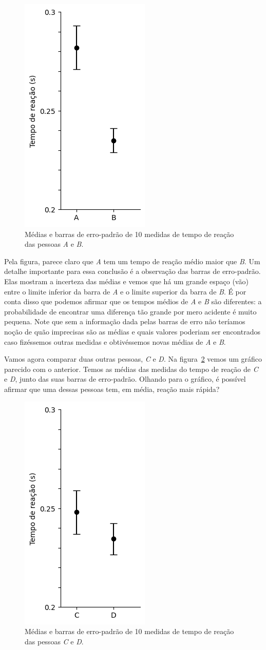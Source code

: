 \documentclass[12pt, a4paper]{article}
\begin{document}
\begin{figure}[H]
    \centering
    \includegraphics[width=0.22\linewidth]{volta de A e B vert.png}
    \caption{Médias e barras de erro-padrão de 10 medidas de tempo de reação das pessoas \textit{A} e \textit{B}.}
    \label{A e B vert}
\end{figure}

Pela figura, parece claro que \textit{A} tem um tempo de reação médio maior que \textit{B}. Um detalhe importante para essa conclusão é a observação das barras de erro-padrão. Elas mostram a incerteza das médias e vemos que há um grande espaço (vão) entre o limite inferior da barra de \textit{A} e o limite superior da barra de \textit{B}. É por conta disso que podemos afirmar que os tempos médios de \textit{A} e \textit{B} são diferentes: a probabilidade de encontrar uma diferença tão grande por mero acidente é muito pequena. Note que sem a informação dada pelas barras de erro não teríamos noção de quão imprecisas são as médias e quais valores poderiam ser encontrados caso fizéssemos outras medidas e obtivéssemos novas médias de \textit{A} e \textit{B}.

Vamos agora comparar duas outras pessoas, \textit{C} e \textit{D}. Na figura~\ref{C e D} vemos um gráfico parecido com o anterior. Temos as médias das medidas do tempo de reação de \textit{C} e \textit{D}, junto das suas barras de erro-padrão. Olhando para o gráfico, é possível afirmar que uma dessas pessoas tem, em média, reação mais rápida?

\begin{figure}[H]
    \centering
    \includegraphics[width=0.22\linewidth]{C e D.png}
    \caption{Médias e barras de erro-padrão de 10 medidas de tempo de reação das pessoas \textit{C} e \textit{D}.}    \label{C e D}
\end{figure}
\end{document}
